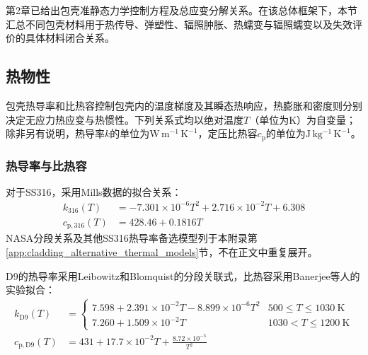 第2章已给出包壳准静态力学控制方程及总应变分解关系。在该总体框架下，本节汇总不同包壳材料用于热传导、弹塑性、辐照肿胀、热蠕变与辐照蠕变以及失效评价的具体材料闭合关系。

\subsection{热物性}
\label{sec:cladding_thermophysical_properties}

包壳热导率和比热容控制包壳内的温度梯度及其瞬态热响应，热膨胀和密度则分别决定无应力热应变与热惯性。下列关系式均以绝对温度$T$（单位为$\mathrm{K}$）为自变量；除非另有说明，热导率$k$的单位为$\mathrm{W\,m^{-1}\,K^{-1}}$，定压比热容$c_{\mathrm p}$的单位为$\mathrm{J\,kg^{-1}\,K^{-1}}$。

\subsubsection{热导率与比热容}

对于SS316，采用Mills数据的拟合关系\cite{mills2002,halesBISONTheoryManual2016}：
\begin{subequations}\label{eq:ss316_thermal_properties}
	\begin{align}
		k_{316}(T)
		&=-7.301\times10^{-6}T^2
		+2.716\times10^{-2}T+6.308
		\label{eq:ss316_thermal_conductivity}\\
		c_{\mathrm p,316}(T)
		&=428.46+0.1816T
		\label{eq:ss316_specific_heat}
	\end{align}
\end{subequations}
NASA分段关系及其他SS316热导率备选模型列于本附录第\ref{app:cladding_alternative_thermal_models}节，不在正文中重复展开。

D9的热导率采用Leibowitz和Blomquist的分段关联式，比热容采用Banerjee等人的实验拟合\cite{Leibowitz_1988,banerjee2007_d9cp}：
\begin{subequations}\label{eq:d9_thermal_properties}
	\begin{align}
		k_{\mathrm{D9}}(T)
		&=
		\begin{cases}
			7.598+2.391\times10^{-2}T-8.899\times10^{-6}T^2
			&500\leq T\leq1030\ \mathrm{K}\\
			7.260+1.509\times10^{-2}T
			&1030<T\leq1200\ \mathrm{K}
		\end{cases}
		\label{eq:d9_thermal_conductivity}\\
		c_{\mathrm p,\mathrm{D9}}(T)
		&=431+17.7\times10^{-2}T
		+\frac{8.72\times10^{-5}}{T^2}
		\label{eq:d9_specific_heat}
	\end{align}
\end{subequations}

